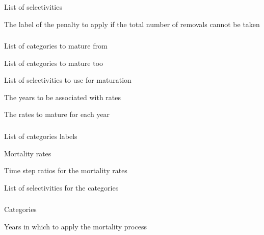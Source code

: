  {List of selectivities}

 {The label of the penalty to apply if the total number of removals cannot be taken}

\subsubsection[Maturation]{}

 {List of categories to mature from}

 {List of categories to mature too}

 {List of selectivities to use for maturation}

 {The years to be associated with rates}

 {The rates to mature for each year}

\subsubsection[Mortality Constant Rate]{}

 {List of categories labels}

 {Mortality rates}

 {Time step ratios for the mortality rates}

 {List of selectivities for the categories}

\subsubsection[Mortality Event]{}

 {Categories}

 {Years in which to apply the mortality process}

